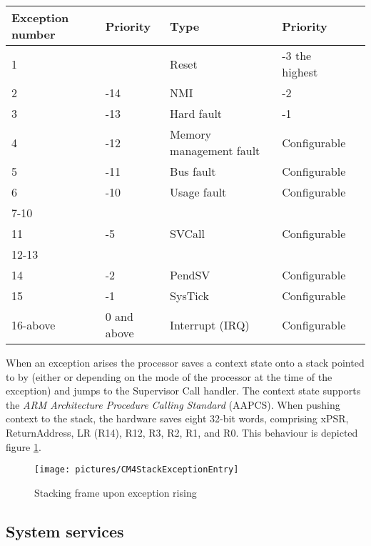 \begin{longtable}[c]{llllp{5cm}}
\toprule
{\bf Exception number} & {\bf Priority} & {\bf Type} & {\bf Priority} \\
\midrule
1 & & Reset & -3 the highest \\
\hline
2 & -14 & NMI & -2 \\
\hline
3 & -13 & Hard fault & -1 \\
\hline
4 & -12 & Memory management fault & Configurable \\
\hline
5 & -11 & Bus fault & Configurable \\
\hline
6 & -10 & Usage fault & Configurable \\
\hline
7-10 & & & \\
\hline
11 & -5 & SVCall & Configurable \\
\hline
12-13 & & & \\
\hline
14 & -2 & PendSV & Configurable \\
\hline
15 & -1 & SysTick & Configurable \\
\hline
16-above & 0 and above & Interrupt (IRQ) & Configurable \\
\bottomrule
\end{longtable}

When an exception arises the processor saves a context state onto a stack pointed to by  (either  or  depending on the mode of the processor at the time of the exception) and jumps to the Supervisor Call handler. The context state supports the \textit{ARM Architecture Procedure Calling Standard} (AAPCS).
When pushing context to the stack, the hardware saves eight 32-bit words, comprising xPSR, ReturnAddress, LR (R14), R12, R3, R2, R1, and R0. This behaviour is depicted figure \ref{fig:CM4StackExceptionEntry}.

\begin{figure}[htbp] %
\begin{minipage}{0.5\textwidth}
    \centering
  \texttt{[image: pictures/CM4StackExceptionEntry]} 
\end{minipage}
\begin{minipage}{0.5\textwidth}
   \caption{Stacking frame upon exception rising}\label{fig:CM4StackExceptionEntry}
\end{minipage}
\end{figure}

\subsection{System services} \label{sec:systemservices}

